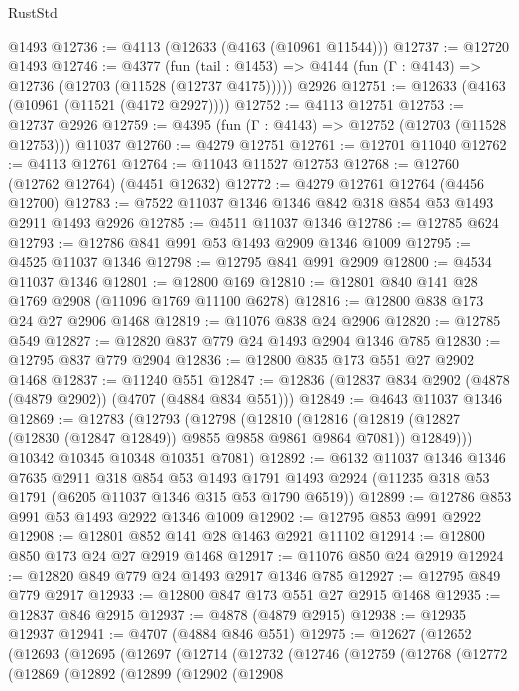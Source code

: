 \begin{lexlean}{RustStd}
\begin{coremodule}
    @1493
@12736 := @4113 (@12633 (@4163 (@10961 @11544)))
@12737 := @12720 @1493
@12746 := @4377
    (fun (tail : @1453) => @4144 (fun (Γ : @4143) => @12736 (@12703 (@11528 (@12737 @4175)))))
    @2926
@12751 := @12633 (@4163 (@10961 (@11521 (@4172 @2927))))
@12752 := @4113 @12751
@12753 := @12737 @2926
@12759 := @4395 (fun (Γ : @4143) => @12752 (@12703 (@11528 @12753))) @11037
@12760 := @4279 @12751
@12761 := @12701 @11040
@12762 := @4113 @12761
@12764 := @11043 @11527 @12753
@12768 := @12760 (@12762 @12764) (@4451 @12632)
@12772 := @4279 @12761 @12764 (@4456 @12700)
@12783 := @7522 @11037 @1346 @1346 @842 @318 @854 @53 @1493 @2911 @1493 @2926
@12785 := @4511 @11037 @1346
@12786 := @12785 @624
@12793 := @12786 @841 @991 @53 @1493 @2909 @1346 @1009
@12795 := @4525 @11037 @1346
@12798 := @12795 @841 @991 @2909
@12800 := @4534 @11037 @1346
@12801 := @12800 @169
@12810 := @12801 @840 @141 @28 @1769 @2908 (@11096 @1769 @11100 @6278)
@12816 := @12800 @838 @173 @24 @27 @2906 @1468
@12819 := @11076 @838 @24 @2906
@12820 := @12785 @549
@12827 := @12820 @837 @779 @24 @1493 @2904 @1346 @785
@12830 := @12795 @837 @779 @2904
@12836 := @12800 @835 @173 @551 @27 @2902 @1468
@12837 := @11240 @551
@12847 := @12836 (@12837 @834 @2902 (@4878 (@4879 @2902)) (@4707 (@4884 @834 @551)))
@12849 := @4643 @11037 @1346
@12869 := @12783
    (@12793
      (@12798
        (@12810
          (@12816 (@12819 (@12827 (@12830 (@12847 @12849)) @9855 @9858 @9861 @9864 @7081)) @12849)))
      @10342
      @10345
      @10348
      @10351
      @7081)
@12892 := @6132
    @11037
    @1346
    @1346
    @7635
    @2911
    @318
    @854
    @53
    @1493
    @1791
    @1493
    @2924
    (@11235 @318 @53 @1791 (@6205 @11037 @1346 @315 @53 @1790 @6519))
@12899 := @12786 @853 @991 @53 @1493 @2922 @1346 @1009
@12902 := @12795 @853 @991 @2922
@12908 := @12801 @852 @141 @28 @1463 @2921 @11102
@12914 := @12800 @850 @173 @24 @27 @2919 @1468
@12917 := @11076 @850 @24 @2919
@12924 := @12820 @849 @779 @24 @1493 @2917 @1346 @785
@12927 := @12795 @849 @779 @2917
@12933 := @12800 @847 @173 @551 @27 @2915 @1468
@12935 := @12837 @846 @2915
@12937 := @4878 (@4879 @2915)
@12938 := @12935 @12937
@12941 := @4707 (@4884 @846 @551)
@12975 := @12627
    (@12652
      (@12693
        (@12695
          (@12697
            (@12714
              (@12732
                (@12746
                  (@12759
                    (@12768
                      (@12772
                        (@12869
                          (@12892
                            (@12899
                              (@12902
                                (@12908

\end{coremodule}
\end{lexlean}
